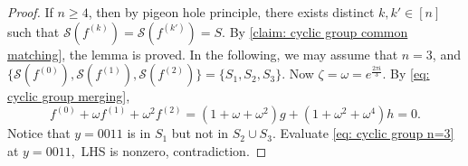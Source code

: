 \begin{proof}
    If $n\ge 4$, then by pigeon hole principle, there exists distinct $k,k'\in [n]$ such that $\mathscr{S}(f^{(k)})=\mathscr{S}(f^{(k')})=S$.
    By \cref{claim: cyclic group common matching}, the lemma is proved.
    In the following, we may assume that $n=3$, and $\{\mathscr{S}(f^{(0)}),\mathscr{S}(f^{(1)}),\mathscr{S}(f^{(2)})\}=\{S_1,S_2,S_3\}.$
    Now $\zeta=\omega=e^{\frac{2\pi \mathfrak{i}}{3}}.$
    By \eqref{eq: cyclic group merging}, 
    \begin{equation}\label{eq: cyclic group n=3}
        f^{(0)}+\omega f^{(1)}+\omega^2 f^{(2)}=(1+\omega+\omega^2)g+(1+\omega^2+\omega^4)h=0.
    \end{equation}
    Notice that $y=0011$ is in $S_1$ but not in $S_2\cup S_3.$
    Evaluate \eqref{eq: cyclic group n=3} at $y=0011,$ LHS is nonzero, contradiction.
\end{proof}

